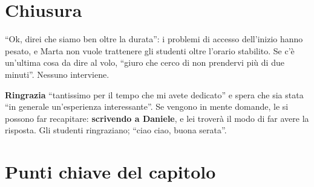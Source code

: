 \section{Chiusura}
\label{a14:sec:chiusura}

``Ok, direi che siamo ben oltre la durata'': i problemi di accesso dell'inizio hanno pesato, e
Marta non vuole trattenere gli studenti oltre l'orario stabilito. Se c'è un'ultima cosa da dire
al volo, ``giuro che cerco di non prendervi più di due minuti''. Nessuno interviene.

\textbf{Ringrazia} ``tantissimo per il tempo che mi avete dedicato'' e spera che sia stata
``in generale un'esperienza interessante''. Se vengono in mente domande, le si possono far
recapitare: \textbf{scrivendo a Daniele}, e lei troverà il modo di far avere la risposta. Gli
studenti ringraziano; ``ciao ciao, buona serata''.

\section*{Punti chiave del capitolo}

